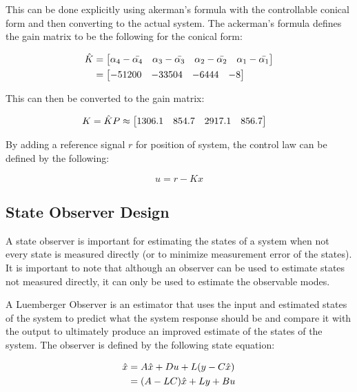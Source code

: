 \documentclass[]{article}
\begin{document}
		This can be done explicitly using akerman's formula with the controllable conical form and then converting to the actual system. The ackerman's formula defines the gain matrix to be the following for the conical form:

		\begin{equation}
			\begin{aligned}
				\hat{K} &= \mqty[\alpha_4 - \bar{\alpha_4} & \alpha_3 - \bar{\alpha_3} & \alpha_2 - \bar{\alpha_2} & \alpha_1 - \bar{\alpha_1}]\\
						&= \mqty[-51200	&-33504	&-6444	&-8]
			\end{aligned}
		\end{equation}
		
		This can then be converted to the gain matrix:
		
		\begin{equation}
			\begin{aligned}
				K &= \hat{K} P \approx \mqty[1306.1	&854.7	&2917.1	&856.7] 
			\end{aligned}
		\end{equation}
		
		By adding a reference signal $r$ for position of system, the control law can be defined by the following:
		
		\begin{equation}
			u = r - K x
		\end{equation}
	
	
	\newpage
	\subsection{State Observer Design}
		A state observer is important for estimating the states of a system when not every state is measured directly (or to minimize measurement error of the states). It is important to note that although an observer can be used to estimate states not measured directly, it can only be used to estimate the observable modes.
		
		A Luemberger Observer is an estimator that uses the input and estimated states of the system to predict what the system response should be and compare it with the output to ultimately produce an improved estimate of the states of the system. The observer is defined by the following state equation:
		
		\begin{equation}
			\begin{aligned}
				\hat{x} &= A \hat{x} + D u + L \qty(y - C \hat{x})\\
						&= \qty(A - L C) \hat{x} + L y + B u
			\end{aligned}
			\label{eq:luemberger_observer}
		\end{equation}
		
\end{document}
